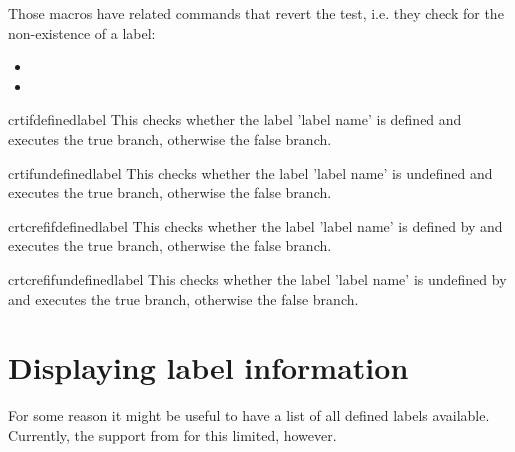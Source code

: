 \documentclass[12pt,a4paper,oneside]{article}
\makeatletter
\newcommand{\chdocextractversion}[1]{%
  \@nameuse{#1}%
}
\makeatother
\begin{document}
Those macros have related commands that revert the test, i.e. they check for the non-existence of a label:

\begin{itemize}
  \item {}
  \item {}
\end{itemize}


\begin{docCommand}[doc new={\chdocextractversion{crossreftoolsversion0.5}}]{crtifdefinedlabel}{}
This checks whether the label 'label name' is defined and executes the true branch, otherwise the false branch. 
\end{docCommand}


\begin{docCommand}[doc new={\chdocextractversion{crossreftoolsversion0.5}}]{crtifundefinedlabel}{}
This checks whether the label 'label name' is undefined and executes the true branch, otherwise the false branch. 
\end{docCommand}

\begin{docCommand}[doc new={\chdocextractversion{crossreftoolsversion0.5}}]{crtcrefifdefinedlabel}{}
This checks whether the label 'label name' is defined by  and executes the true branch, otherwise the false branch. 
\end{docCommand}


\begin{docCommand}[doc new={\chdocextractversion{crossreftoolsversion0.5}}]{crtcrefifundefinedlabel}{}
This checks whether the label 'label name' is undefined by  and executes the true branch, otherwise the false branch. 
\end{docCommand}



\section{Displaying label information}\label{section::listoflabels}

For some reason it might be useful to have a list of all defined labels available. Currently, the support from  for this limited, however. 
\end{document}
